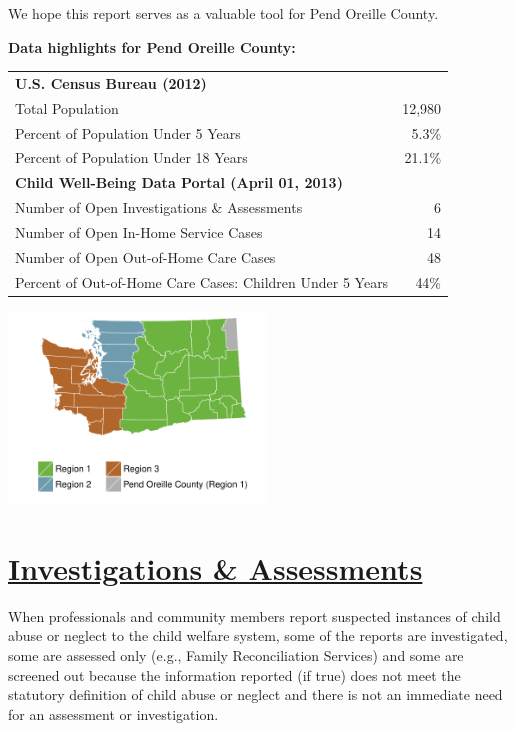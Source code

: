 \documentclass{article}\usepackage[]{graphicx}\usepackage[]{color}
\begin{document}
We hope this report serves as a valuable tool for  Pend Oreille County.

\begin{minipage}{0.6\textwidth}
\textbf{Data highlights for Pend Oreille County:}

\begin{tabular}{lr}
  \toprule
 \textbf{U.S. Census Bureau (2012)} &  \\ 
  \quad Total Population & 12,980 \\ 
  \quad Percent of Population Under 5 Years & 5.3\% \\ 
  \quad Percent of Population Under 18 Years & 21.1\% \\ 
  \textbf{Child Well-Being Data Portal (April 01, 2013)} &  \\ 
  \quad Number of Open Investigations \& Assessments & 6 \\ 
  \quad Number of Open In-Home Service Cases & 14 \\ 
  \quad Number of Open Out-of-Home Care Cases & 48 \\ 
  \quad Percent of Out-of-Home Care Cases: Children Under 5 Years & 44\% \\ 
   \bottomrule
\end{tabular}



\end{minipage}
\begin{minipage}{0.4\textwidth}

\begin{center}
\includegraphics[width=2.7in]{county_maps/Pend_Oreille-b}
\end{center}

\end{minipage}


\newpage
\restoregeometry
\section{\href{http://www.partnersforourchildren.org//child-well-being/visualizations/investigations-assessments/trends}
{Investigations \& Assessments}}
When professionals and community members report suspected instances of child abuse or neglect to the child welfare system, some of the reports are investigated, some are assessed only (e.g., Family Reconciliation Services) and some are screened out because the information reported (if true) does not meet the statutory definition of child abuse or neglect and there is not an immediate need for an assessment or investigation.\\[6pt]
\label{p:ia}
\end{document}
